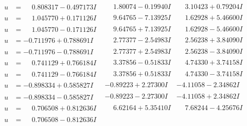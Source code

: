 \documentclass[1p]{elsarticle_modified}
\theoremstyle{definition}
\begin{document}
$$\begin{array}{c|c|c}
\begin{aligned}
u &= \phantom{-}0.808317 - 0.497173 I\end{aligned}
 & \phantom{-}1.80074 - 0.19940 I & \phantom{-}3.10423 + 0.79204 I \\ \hline\begin{aligned}
u &= \phantom{-}1.045770 + 0.171126 I\end{aligned}
 & \phantom{-}9.64765 - 7.13925 I & \phantom{-}1.62928 + 5.46600 I \\ \hline\begin{aligned}
u &= \phantom{-}1.045770 - 0.171126 I\end{aligned}
 & \phantom{-}9.64765 + 7.13925 I & \phantom{-}1.62928 - 5.46600 I \\ \hline\begin{aligned}
u &= -0.711976 + 0.788691 I\end{aligned}
 & \phantom{-}2.77377 - 2.54983 I & \phantom{-}2.56238 + 3.84090 I \\ \hline\begin{aligned}
u &= -0.711976 - 0.788691 I\end{aligned}
 & \phantom{-}2.77377 + 2.54983 I & \phantom{-}2.56238 - 3.84090 I \\ \hline\begin{aligned}
u &= \phantom{-}0.741129 + 0.766184 I\end{aligned}
 & \phantom{-}3.37856 - 0.51833 I & \phantom{-}4.74330 + 3.74158 I \\ \hline\begin{aligned}
u &= \phantom{-}0.741129 - 0.766184 I\end{aligned}
 & \phantom{-}3.37856 + 0.51833 I & \phantom{-}4.74330 - 3.74158 I \\ \hline\begin{aligned}
u &= -0.898334 + 0.585827 I\end{aligned}
 & -0.89223 + 2.27300 I & -4.11058 - 2.34862 I \\ \hline\begin{aligned}
u &= -0.898334 - 0.585827 I\end{aligned}
 & -0.89223 - 2.27300 I & -4.11058 + 2.34862 I \\ \hline\begin{aligned}
u &= \phantom{-}0.706508 + 0.812636 I\end{aligned}
 & \phantom{-}6.62164 + 5.35410 I & \phantom{-}7.68244 - 4.25676 I \\ \hline\begin{aligned}
u &= \phantom{-}0.706508 - 0.812636 I\end{aligned}

\end{array}$$
\end{document}
